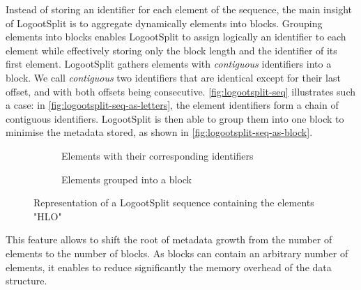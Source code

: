 \documentclass[sigplan,10pt,authorversion]{acmart}
\newcommand{\trm}[1]{\mathit{#1}}
\newcommand{\id}[3]{$\trm{#1}^{\trm{#2}}_{\trm{#3}}$}
\newcommand{\widthletter}{7mm}
\begin{document}
Instead of storing an identifier for each element of the sequence, the main insight of LogootSplit is to aggregate dynamically elements into blocks.
Grouping elements into blocks enables LogootSplit to assign logically an identifier to each element while effectively storing only the block length and the identifier of its first element.
LogootSplit gathers elements with \emph{contiguous} identifiers into a block.
We call \emph{contiguous} two identifiers that are identical except for their last offset, and with both offsets being consecutive.
\autoref{fig:logootsplit-seq} illustrates such a case: in \autoref{fig:logootsplit-seq-as-letters}, the element identifiers form a chain of contiguous identifiers.
LogootSplit is then able to group them into one block to minimise the metadata stored, as shown in \autoref{fig:logootsplit-seq-as-block}.

\begin{figure}[ht!]
    \begin{subfigure}{0.38\columnwidth}
        \centering
        \caption{Elements with their corresponding identifiers}
        \label{fig:logootsplit-seq-as-letters}
    \end{subfigure}
    \hspace{0.03\columnwidth}
    \begin{subfigure}{0.45\columnwidth}
        \centering
        \caption{Elements grouped into a block}
        \label{fig:logootsplit-seq-as-block}
    \end{subfigure}
    \caption{Representation of a LogootSplit sequence containing the elements "HLO"}
    \label{fig:logootsplit-seq}
\end{figure}

This feature allows to shift the root of metadata growth from the number of elements to the number of blocks.
As blocks can contain an arbitrary number of elements, it enables to reduce significantly the memory overhead of the data structure.
\end{document}
